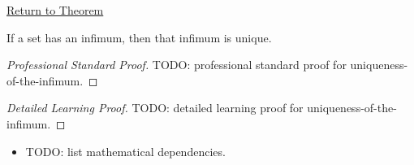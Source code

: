 \newpage
{}
\label{prf:uniqueness-of-the-infimum}

\begin{remark*}[Return]
\hyperref[prop:uniqueness-of-the-infimum]{Return to Theorem}
\end{remark*}

\begin{proposition*}
If a set has an infimum, then that infimum is unique.
\end{proposition*}

\begin{proof}[Professional Standard Proof]
\LRAProofBodyStart
TODO: professional standard proof for uniqueness-of-the-infimum.
\end{proof}

\begin{proof}[Detailed Learning Proof]
\LRAProofBodyStart
TODO: detailed learning proof for uniqueness-of-the-infimum.
\end{proof}

\begin{remark*}
\end{remark*}

\begin{dependencies}
\begin{itemize}
  \item TODO: list mathematical dependencies.
\end{itemize}
\end{dependencies}

\clearpage
